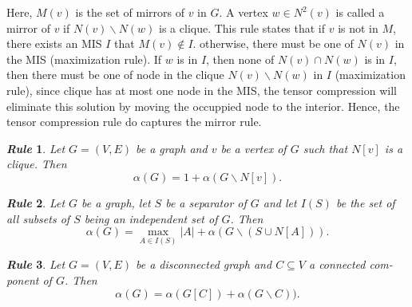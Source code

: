 \documentclass{article}
\newcommand{\<}{\langle}
\renewcommand{\>}{\rangle}
\newtheorem{theorem}{\textit{Rule}}
\theoremstyle{definition}\newtheorem{definition}{\textit{Definition}}
\begin{document}
Here, $M(v)$ is the set of mirrors of $v$ in $G$.
A vertex $w \in N^2(v)$ is called a mirror of $v$ if $N(v) \backslash N(w)$ is a clique.
This rule states that if $v$ is not in $M$, there exists an MIS $I$ that $M(v)\notin I$.
otherwise, there must be one of $N(v)$ in the MIS (maximization rule).
If $w$ is in $I$, then none of $N(v) \cap N(w)$ is in $I$, then there must be one of node in the clique $N(v)\backslash N(w)$ in $I$ (maximization rule),
since clique has at most one node in the MIS, the tensor compression will eliminate this solution by moving the occuppied node to the interior.
Hence, the tensor compression rule do captures the mirror rule.

\begin{theorem} %
Let $G = (V, E)$ be a graph and $v$ be a vertex of $G$ such that $N[v]$ is a
clique. Then
\begin{equation}
\alpha(G) = 1 + \alpha(G \backslash N[v]).
\end{equation}
\end{theorem}


\begin{theorem}  %
Let $G$ be a graph, let $S$ be a separator of $G$ and let $I(S)$ be the set of
all subsets of $S$ being an independent set of $G$. Then
\begin{equation}
\alpha(G) = \max_{A\in I(S)} |A| + \alpha(G \backslash (S \cup N[A])).
\end{equation}
\end{theorem}

\begin{theorem}  %
Let $G = (V, E)$ be a disconnected graph and $C \subseteq V$ a connected com-
ponent of $G$. Then
\begin{equation}
\alpha(G) = \alpha(G[C]) + \alpha(G \backslash C)).
\end{equation}
\end{theorem}
\end{document}
